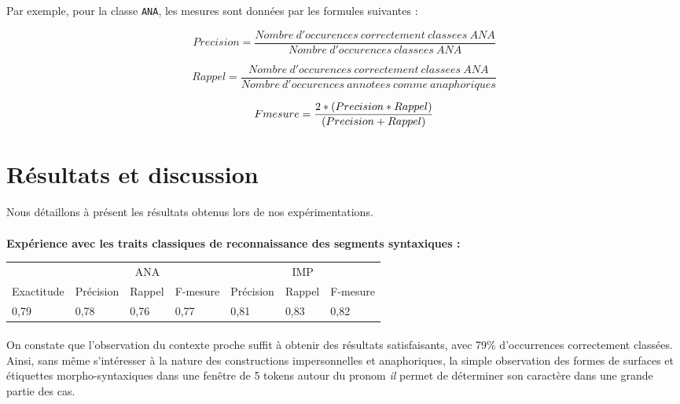 \documentclass[a4paper,12pt]{article}
\begin{document}
Par exemple, pour la classe \verb!ANA!, les mesures sont données par les formules suivantes :

\begin{equation}
\label{Precision}
Precision = \frac{Nombre\ d'occurences\ correctement\ classees\ ANA}{Nombre\ d'occurences\ classees\ ANA}
\end{equation}

\begin{equation}
\label{Rappel}
Rappel = \frac{Nombre\ d'occurences\ correctement\ classees\ ANA}{Nombre\ d'occurences\ annotees\ comme\ anaphoriques}
\end{equation}

\begin{equation}
\label{Fmesure}
F\-mesure = \frac{2 * (Precision * Rappel)}{(Precision + Rappel)}
\end{equation}


\section{Résultats et discussion}
\label{resultats}

Nous détaillons à présent les résultats obtenus lors de nos expérimentations.

\paragraph{}
\textbf{Expérience avec les traits classiques de reconnaissance des segments syntaxiques :}

\begin{tabular}[H]{l|lll|lll}
& \multicolumn{3}{c|}{ANA} & \multicolumn{3}{c}{IMP}\\
Exactitude & Précision & Rappel & F-mesure & Précision & Rappel & F-mesure\\
\hline
0,79 & 0,78 & 0,76 & 0,77 & 0,81 & 0,83 & 0,82\\
\hline
\end{tabular}

\paragraph{}
On constate que l'observation du contexte proche suffit à obtenir des résultats satisfaisants, avec 79\% d'occurrences correctement classées. Ainsi, sans même s'intéresser à la nature des constructions impersonnelles et anaphoriques, la simple observation des formes de surfaces et étiquettes morpho-syntaxiques dans une fenêtre de 5 tokens autour du pronom \textit{il} permet de déterminer son caractère dans une grande partie des cas.
\end{document}
